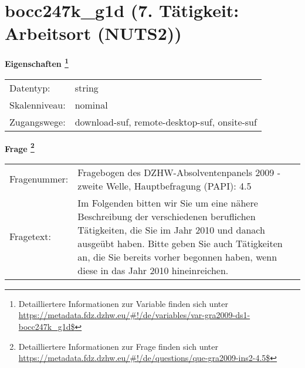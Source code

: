 
    \setcounter{footnote}{0}

    \vspace*{-1.8cm}
	\section{bocc247k\_g1d (7. Tätigkeit: Arbeitsort (NUTS2))}
	\label{section:bocc247k_g1d}



    \vspace*{0.5cm}
    \noindent\textbf{Eigenschaften
	\footnote{Detailliertere Informationen zur Variable finden sich unter
		\url{https://metadata.fdz.dzhw.eu/\#!/de/variables/var-gra2009-ds1-bocc247k_g1d$}}}\\
	\begin{tabularx}{\hsize}{@{}lX}
	Datentyp: & string \\
	Skalenniveau: & nominal \\
	Zugangswege: &
	  download-suf, 
	  remote-desktop-suf, 
	  onsite-suf
 \\
    \end{tabularx}



				\vspace*{0.5cm}
                \noindent\textbf{Frage
	                \footnote{Detailliertere Informationen zur Frage finden sich unter
		              \url{https://metadata.fdz.dzhw.eu/\#!/de/questions/que-gra2009-ins2-4.5$}}}\\
				\begin{tabularx}{\hsize}{@{}lX}
					Fragenummer: &
					  Fragebogen des DZHW-Absolventenpanels 2009 - zweite Welle, Hauptbefragung (PAPI):
					  4.5
 \\
					Fragetext: & Im Folgenden bitten wir Sie um eine nähere Beschreibung der verschiedenen beruflichen Tätigkeiten, die Sie im Jahr 2010 und danach ausgeübt haben. Bitte geben Sie auch Tätigkeiten an, die Sie bereits vorher begonnen haben, wenn diese in das Jahr 2010 hineinreichen. \\
				\end{tabularx}





